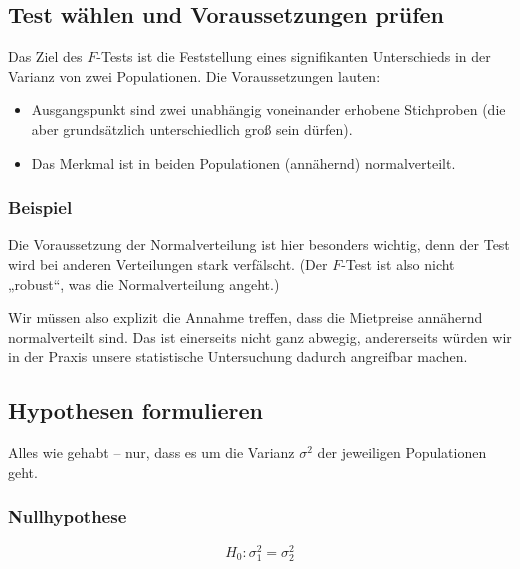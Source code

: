\documentclass[
  11pt,
  ngerman,
  a4paper,
]{report}
\providecommand{\tightlist}{%
  \setlength{\itemsep}{0pt}\setlength{\parskip}{0pt}}
\begin{document}
\hypertarget{test-wuxe4hlen-und-voraussetzungen-pruxfcfen-3}{%
\subsection{Test wählen und Voraussetzungen prüfen}\label{test-wuxe4hlen-und-voraussetzungen-pruxfcfen-3}}

Das Ziel des \(F\)-Tests ist die Feststellung eines signifikanten Unterschieds in der Varianz von zwei Populationen. Die Voraussetzungen lauten:

\begin{itemize}
\tightlist
\item
  Ausgangspunkt sind zwei unabhängig voneinander erhobene Stichproben (die aber grundsätzlich unterschiedlich groß sein dürfen).
\item
  Das Merkmal ist in beiden Populationen (annähernd) normalverteilt.
\end{itemize}

\hypertarget{beispiel-17}{%
\subsubsection{Beispiel}\label{beispiel-17}}

Die Voraussetzung der Normalverteilung ist hier besonders wichtig, denn der Test wird bei anderen Verteilungen stark verfälscht. (Der \(F\)-Test ist also nicht „robust``, was die Normalverteilung angeht.)

Wir müssen also explizit die Annahme treffen, dass die Mietpreise annähernd normalverteilt sind. Das ist einerseits nicht ganz abwegig, andererseits würden wir in der Praxis unsere statistische Untersuchung dadurch angreifbar machen.

\hypertarget{hypothesen-formulieren-3}{%
\subsection{Hypothesen formulieren}\label{hypothesen-formulieren-3}}

Alles wie gehabt -- nur, dass es um die Varianz \(\sigma^2\) der jeweiligen Populationen geht.

\hypertarget{nullhypothese-3}{%
\subsubsection{Nullhypothese}\label{nullhypothese-3}}

\[
H_0: \sigma^2_1=\sigma^2_2
\label{eq:h0f}
\]
\end{document}
